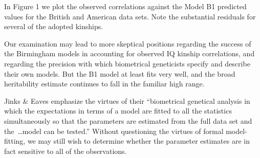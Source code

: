 ﻿\documentclass[12pt]{article}
\begin{document}

In Figure 1 we plot the observed correlations against the Model B1 predicted values for the British and American data sets. Note the substantial residuals for several of the adopted kinships.

Our examination may lead to more skeptical positions regarding the success of the Birmingham models in accounting for observed IQ kinship correlations, and regarding the precision with which biometrical geneticists specify and describe their own models. But the B1 model at least fits very well, and the broad heritability estimate continues to fall in the familiar high range.

Jinks \& Eaves emphasize the virtues of their ``biometrical genetical analysis in which the expectations in terms of a model are fitted to all the statistics simultaneously so that the parameters are estimated from the full data set and the~\ldots model can be tested.'' Without questioning the virtues of formal model-fitting, we may still wish to determine whether the parameter estimates are in fact sensitive to all of the observations.
\end{document}

